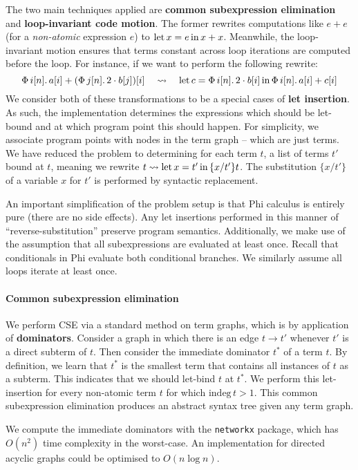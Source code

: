 The two main techniques applied are \textbf{common subexpression elimination} and \textbf{loop-invariant code motion}. The former rewrites computations like $e + e$ (for a \textit{non-atomic} expression $e$) to  $\mathrm{let}\,{x}={e}\,\mathrm{in}\,{x + x}$. Meanwhile, the loop-invariant motion ensures that terms constant across loop iterations are computed before the loop. For instance, if we want to perform the following rewrite:
$$ 
\phivec{i}{n}{a[i] + \left( \phivec{j}{n}{2 \cdot b[j]} \right)[i]} \quad\leadsto\quad \philet{c}{\phivec{i}{n}{2 \cdot b[i]}}{\phivec{i}{n}{a[i] + c[i]}} 
$$
We consider both of these transformations to be a special cases of \textbf{let insertion}. As such, the implementation determines the expressions which should be let-bound and at which program point this should happen. For simplicity, we associate program points with nodes in the term graph -- which are just terms. We have reduced the problem to determining for each term $t$, a list of terms $t'$ bound at $t$, meaning we rewrite $t \leadsto \mathrm{let}\,{x}={t'}\,\mathrm{in}\,{\{x/t'\}t}$. The substitution $\{x/t'\}$ of a variable $x$ for $t'$ is performed by syntactic replacement.

An important simplification of the problem setup is that Phi calculus is entirely pure (there are no side effects). Any let insertions performed in this manner of ``reverse-substitution'' preserve program semantics. Additionally, we make use of the assumption that all subexpressions are evaluated at least once. Recall that conditionals in Phi evaluate both conditional branches. We similarly assume all loops iterate at least once.

\paragraph{Common subexpression elimination} We perform CSE via a standard method on term graphs, which is by application of \textbf{dominators}. Consider a graph in which there is an edge $t \to t'$ whenever $t'$ is a direct subterm of $t$. Then consider the immediate dominator $t^*$ of a term $t$. By definition, we learn that $t^*$ is the smallest term that contains all instances of $t$ as a subterm. This indicates that we should let-bind $t$ at $t^*$. We perform this let-insertion for every non-atomic term $t$ for which $\mathrm{indeg}\,t > 1$. This common subexpression elimination produces an abstract syntax tree given any term graph.

We compute the immediate dominators with the \texttt{networkx} package, which has $O(n^2)$ time complexity in the worst-case. An implementation for directed acyclic graphs could be optimised to $O(n \log n)$.

